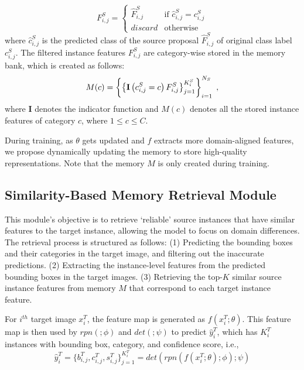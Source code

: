 \documentclass{bmvc2k}
\begin{document}
\begin{equation}
    F^S_{i,j} = \begin{cases} \hat{F}^S_{i,j} & \text{if } \hat{c}^S_{i,j} = c^S_{i,j} \\
discard & \text{otherwise}
\end{cases}
\end{equation}
where $\hat{c}^S_{i,j}$ is the predicted class of the source proposal $\hat{F}^S_{i,j}$ of original class label $c^S_{i,j}$.
The filtered instance features $F^S_{i,j}$ are category-wise stored in the memory bank, which is created as follows:
\begin{equation}
M(c) = \left\{\left\{\mathbf{I}\left(c^S_{i,j} = c\right)F^S_{i,j}\right \}_{j=1}^{K^S_i}\right\}_{i=1}^{N_S} \hspace{1mm} ,
\end{equation}
where $\mathbf{I}$ denotes the indicator function and $M(c)$ denotes all the stored instance features of category $c$, where $1 \leq c \leq C$.







During training, as $\theta$ gets updated and $f$ extracts more domain-aligned features, we propose dynamically updating the memory to store high-quality representations. Note that the memory $M$ is only created during training.



\subsection{Similarity-Based Memory Retrieval Module} \label{sec:retrieval module}
This module's objective is to retrieve `reliable' source instances that have similar features to the target instance, allowing the model to focus on domain differences.
The retrieval process is structured as follows: (1) Predicting the bounding boxes and their categories in the target image, and filtering out the inaccurate predictions. (2) Extracting the instance-level features from the predicted bounding boxes in the target images. (3) Retrieving the top-$K$ similar source instance features from memory $M$ that correspond to each target instance feature.








For $i^{th}$ target image $x^T_i$, the feature map is generated as $f(x^T_i; \theta)$. This feature map is then used by $rpn(;\phi)$ and $det(;\psi)$ to predict $\hat{y}^T_{i}$, which has $K^T_i$ instances with bounding box, category, and confidence score, i.e., 
\begin{equation}
    \hat{y}^T_{i} =\{b_{i,j}^T, c_{i,j}^T, s_{i,j}^T\}_{j=1}^{K^T_i} = det( rpn( f(x^T_i; \theta); \phi); \psi)
\end{equation}
\end{document}

